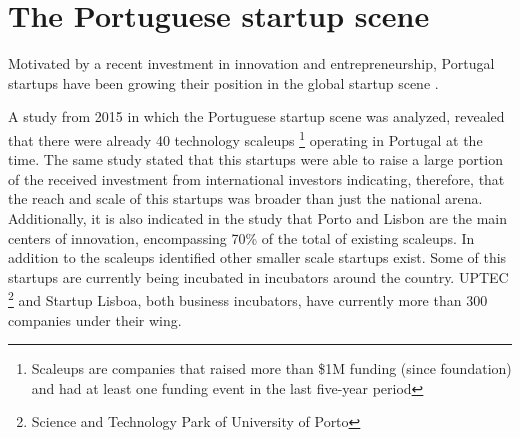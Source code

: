 	\section{The Portuguese startup scene} \label{sec:stateoftheart:sec:portuguesestartupscene}
    	Motivated by a recent investment in innovation and entrepreneurship, Portugal startups have been growing their position in the global startup scene \cite{Coleman2015}.  
        
       A study from 2015 \citet{StartupEuropePartnership2015} in which the Portuguese startup scene was analyzed, revealed that there were already 40 technology scaleups \footnote{Scaleups are companies that raised more than \$1M funding (since foundation) and had at least one funding event in the last five-year period } operating in Portugal at the time. The same study stated that this startups were able to raise a large portion of the received investment from international investors indicating, therefore, that the reach and scale of this startups was broader than just the national arena. Additionally, it is also indicated in the study that Porto and Lisbon are the main centers of innovation, encompassing 70\% of the total of existing scaleups. In addition to the scaleups identified other smaller scale startups exist. Some of this startups are currently being incubated in incubators around the country. UPTEC \footnote{Science and Technology Park of University of Porto} and Startup Lisboa, both business incubators, have currently more than 300 companies \cite{Uptec,StartupLisboa} under their wing. 
